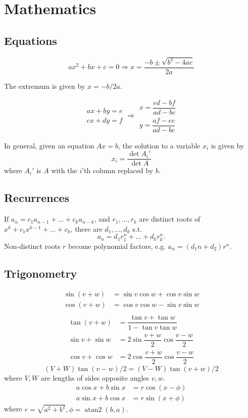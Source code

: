 
\chapter{Mathematics}

\section{Equations}
\[ax^2+bx+c=0 \Rightarrow x = \frac{-b\pm\sqrt{b^2-4ac}}{2a}\]

The extremum is given by $x = -b/2a$.

\[\begin{aligned}ax+by=e\\cx+dy=f\end{aligned}
\Rightarrow
\begin{aligned}x=\dfrac{ed-bf}{ad-bc}\\y=\dfrac{af-ec}{ad-bc}\end{aligned}\]

In general, given an equation $Ax = b$, the solution to a variable $x_i$ is given by
\[x_i = \frac{\det A_i'}{\det A} \]
where $A_i'$ is $A$ with the $i$'th column replaced by $b$.

\section{Recurrences}
If $a_n = c_1 a_{n-1} + \dots + c_k a_{n-k}$, and $r_1, \dots, r_k$ are distinct roots of $x^k + c_1 x^{k-1} + \dots + c_k$, there are $d_1, \dots, d_k$ s.t.
\[a_n = d_1r_1^n + \dots + d_kr_k^n. \]
Non-distinct roots $r$ become polynomial factors, e.g. $a_n = (d_1n + d_2)r^n$.

\section{Trigonometry}
\begin{align*}
\sin(v+w)&{}=\sin v\cos w+\cos v\sin w\\
\cos(v+w)&{}=\cos v\cos w-\sin v\sin w\\
\end{align*}
\begin{align*}
\tan(v+w)&{}=\dfrac{\tan v+\tan w}{1-\tan v\tan w}\\
\sin v+\sin w&{}=2\sin\dfrac{v+w}{2}\cos\dfrac{v-w}{2}\\
\cos v+\cos w&{}=2\cos\dfrac{v+w}{2}\cos\dfrac{v-w}{2}
\end{align*}
\[ (V+W)\tan(v-w)/2{}=(V-W)\tan(v+w)/2 \]
where $V, W$ are lengths of sides opposite angles $v, w$.
\begin{align*}
	a\cos x+b\sin x&=r\cos(x-\phi)\\
	a\sin x+b\cos x&=r\sin(x+\phi)
\end{align*}
where $r=\sqrt{a^2+b^2}, \phi=\operatorname{atan2}(b,a)$.

